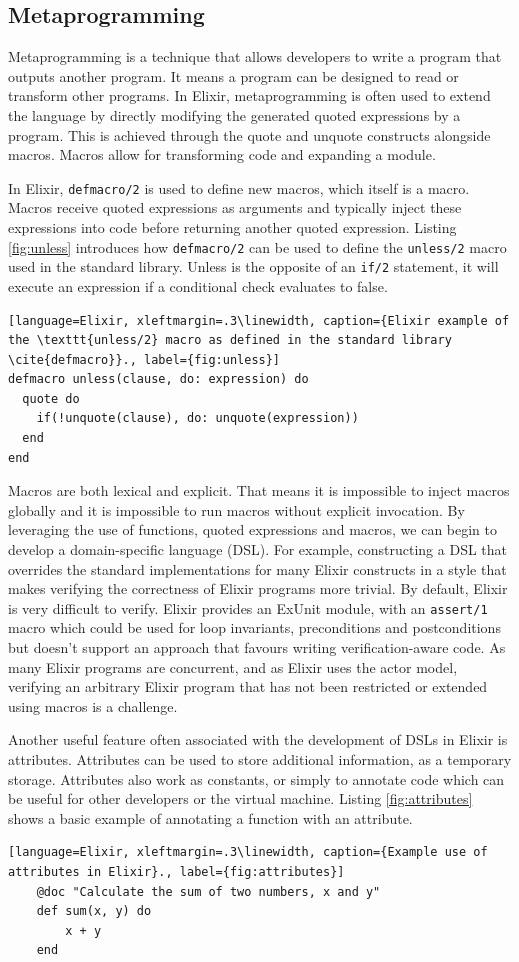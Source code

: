 \subsection[]{Metaprogramming}
Metaprogramming is a technique that allows developers to write a program that outputs another program. It means a program can be designed to read or transform other programs. In Elixir, metaprogramming is often used to extend the language by directly modifying the generated quoted expressions by a program. This is achieved through the quote and unquote constructs alongside macros. Macros allow for transforming code and expanding a module.
\par
In Elixir, \texttt{defmacro/2} is used to define new macros, which itself is a macro. Macros receive quoted expressions as arguments and typically inject these expressions into code before returning another quoted expression. Listing \ref{fig:unless} introduces how \texttt{defmacro/2} can be used to define the \texttt{unless/2} macro used in the standard library. Unless is the opposite of an \texttt{if/2} statement, it will execute an expression if a conditional check evaluates to false.
\begin{lstlisting}[language=Elixir, xleftmargin=.3\linewidth, caption={Elixir example of the \texttt{unless/2} macro as defined in the standard library \cite{defmacro}}., label={fig:unless}]
defmacro unless(clause, do: expression) do
  quote do
    if(!unquote(clause), do: unquote(expression))
  end
end
\end{lstlisting}
\par
Macros are both lexical and explicit. That means it is impossible to inject macros globally and it is impossible to run macros without explicit invocation. By leveraging the use of functions, quoted expressions and macros, we can begin to develop a domain-specific language (DSL). For example, constructing a DSL that overrides the standard implementations for many Elixir constructs in a style that makes verifying the correctness of Elixir programs more trivial. By default, Elixir is very difficult to verify. Elixir provides an ExUnit module, with an \texttt{assert/1} macro which could be used for loop invariants, preconditions and postconditions but doesn't support an approach that favours writing verification-aware code. As many Elixir programs are concurrent, and as Elixir uses the actor model, verifying an arbitrary Elixir program that has not been restricted or extended using macros is a challenge.
\par
Another useful feature often associated with the development of DSLs in Elixir is attributes. Attributes can be used to store additional information, as a temporary storage. Attributes also work as constants, or simply to annotate code which can be useful for other developers or the virtual machine. Listing \ref{fig:attributes} shows a basic example of annotating a function with an attribute.
\begin{lstlisting}[language=Elixir, xleftmargin=.3\linewidth, caption={Example use of attributes in Elixir}., label={fig:attributes}]
    @doc "Calculate the sum of two numbers, x and y"
    def sum(x, y) do
        x + y
    end
\end{lstlisting}

